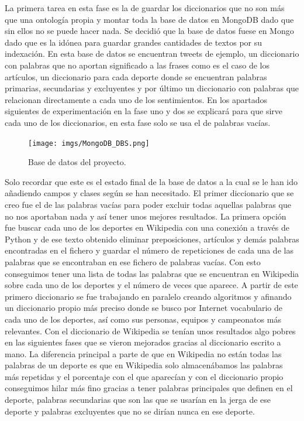 \documentclass[../all.tex]{subfiles}
\begin{document}
	La primera tarea en esta fase es la de guardar los diccionarios que no son más que una ontología propia y montar toda la base de datos en MongoDB dado que sin ellos no se puede hacer nada. Se decidió que la base de datos fuese en Mongo dado que es la idónea para guardar grandes cantidades de textos por su indexación. En esta base de datos se encuentran tweets de ejemplo, un diccionario con palabras que no aportan significado a las frases como es el caso de los artículos, un diccionario para cada deporte donde se encuentran palabras primarias, secundarias y excluyentes y por último un diccionario con palabras que relacionan directamente a cada uno de los sentimientos. En los apartados siguientes de experimentación en la fase uno y dos se explicará para que sirve cada uno de los diccionarios, en esta fase solo se usa el de palabras vacías.\\
	
	\begin{figure}[H]
		\centering
		\texttt{[image: imgs/MongoDB\_DBS.png]}
		\caption{Base de datos del proyecto.}
	\end{figure}

	Solo recordar que este es el estado final de la base de datos a la cual se le han ido añadiendo campos y clases según se han necesitado. El primer diccionario que se creo fue el de las palabras vacías para poder excluir todas aquellas palabras que no nos aportaban nada y así tener unos mejores resultados. La primera opción fue buscar cada uno de los deportes en Wikipedia con una conexión a través de Python y de ese texto obtenido eliminar preposiciones, artículos y demás palabras encontradas en el fichero y guardar el número de repeticiones de cada una de las palabras que se encontraban en ese fichero de palabras vacías. Con esto conseguimos tener una lista de todas las palabras que se encuentran en Wikipedia sobre cada uno de los deportes y el número de veces que aparece. A partir de este primero diccionario se fue trabajando en paralelo creando algoritmos y afinando un diccionario propio más preciso donde se busco por Internet vocabulario de cada uno de los deportes, así como sus personas, equipos y campeonatos más relevantes. Con el diccionario de Wikipedia se tenían unos resultados algo pobres en las siguientes fases que se vieron mejorados gracias al diccionario escrito a mano. La diferencia principal a parte de que en Wikipedia no están todas las palabras de un deporte es que en Wikipedia solo almacenábamos las palabras más repetidas y el porcentaje con el que aparecían y con el diccionario propio conseguimos hilar más fino gracias a tener palabras principales que definen en el deporte, palabras secundarias que son las que se usarían en la jerga de ese deporte y palabras excluyentes que no se dirían nunca en ese deporte.\\
	
\end{document}
